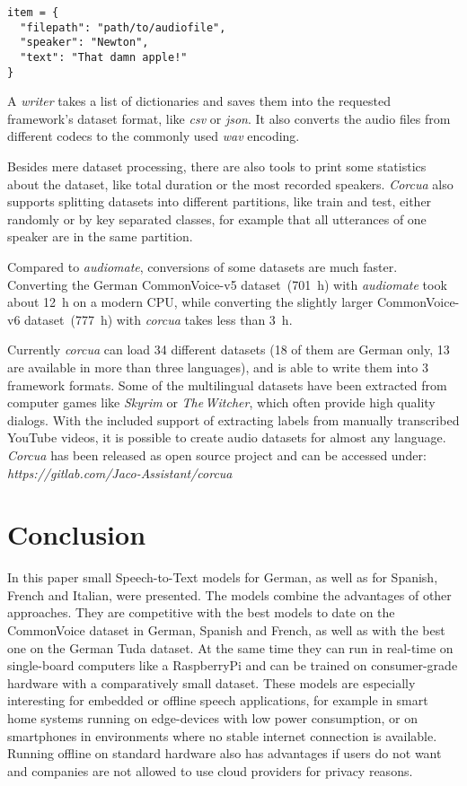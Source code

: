 \documentclass[a4paper]{article}
\begin{document}
\noindent
\begin{minipage}{\linewidth}
\begin{lstlisting}
item = {
  "filepath": "path/to/audiofile",
  "speaker": "Newton",
  "text": "That damn apple!"
}	
\end{lstlisting}
\end{minipage}

A \textit{writer} takes a list of dictionaries and saves them into the requested framework's dataset format, like \textit{csv} or \textit{json}. It also converts the audio files from different codecs to the commonly used \textit{wav} encoding.

Besides mere dataset processing, there are also tools to print some statistics about the dataset, like total duration or the most recorded speakers. \textit{Corcua} also supports splitting datasets into different partitions, like train and test, either randomly or by key separated classes, for example that all utterances of one speaker are in the same partition.

\vspace{9pt}
Compared to \textit{audiomate}, conversions of some datasets are much faster. Converting the German CommonVoice-v5 dataset~(\SI{701}{\hour}) with \textit{audiomate} took about \SI{12}{\hour} on a modern CPU, while converting the slightly larger CommonVoice-v6 dataset~(\SI{777}{\hour}) with \textit{corcua} takes less than \SI{3}{\hour}. 

Currently \textit{corcua} can load 34 different datasets (18 of them are German only, 13 are available in more than three languages), and is able to write them into 3 framework formats.
Some of the multilingual datasets have been extracted from computer games like \textit{Skyrim} or \textit{The\,Witcher}, which often provide high quality dialogs. With the included support of extracting labels from  manually transcribed YouTube videos, it is possible to create audio datasets for almost any language.
\textit{Corcua} has been released as open source project and can be accessed under: \textit{https://gitlab.com/Jaco-Assistant/corcua}

\section{Conclusion}
\label{sec:conclu}

In this paper small Speech-to-Text models for German, as well as for Spanish, French and Italian, were presented. The models combine the advantages of other approaches. They are competitive with the best models to date on the CommonVoice dataset in German, Spanish and French, as well as with the best one on the German Tuda dataset. At the same time they can run in real-time on single-board computers like a RaspberryPi and can be trained on consumer-grade hardware with a comparatively small dataset.
These models are especially interesting for embedded or offline speech applications, for example in smart home systems running on edge-devices with low power consumption, or on smartphones in environments where no stable internet connection is available. Running offline on standard hardware also has advantages if users do not want and companies are not allowed to use cloud providers for privacy reasons. 



\end{document}

